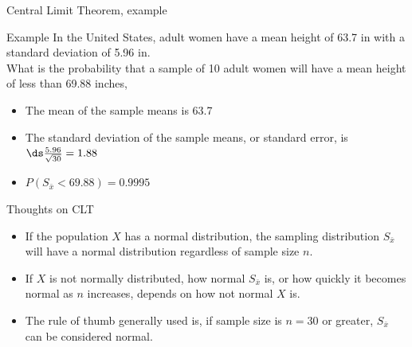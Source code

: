 \documentclass[xcolor=table, handout]{beamer}
\begin{document}
\begin{frame}{Central Limit Theorem, example}
\begin{exampleblock}{Example}
In the United States, adult women have a mean height of 63.7 in with a standard deviation of 5.96 in. \\
\medskip
What is the probability that a sample of 10 adult women will have a mean height of less than 69.88 inches,
\begin{itemize}
\pause\item The mean of the sample means is 63.7
\pause\item The standard deviation of the sample means, or standard error, is $\ds \frac {5.96}{\sqrt{30}} = 1.88$  
\pause\item $P(S_{\bar x} < 69.88) = 0.9995$
\end{itemize}
\end{exampleblock}

\end{frame}

\begin{frame}{Thoughts on CLT}
\begin{block}{}
\begin{itemize}
\item If the population $X$ has a normal distribution, the sampling distribution $S_{\bar x}$ will have a normal distribution regardless of sample size $n$.
\pause\item If $X$ is not normally distributed, how normal $S_{\bar x}$ is, or how quickly it becomes normal as $n$ increases, depends on how not normal $X$ is.
\pause\item The rule of thumb generally used is, if sample size is $n=30$ or greater, $S_{\bar x}$ can be considered normal.
\end{itemize}

\end{block}
\end{frame}
\end{document}
